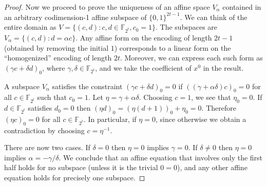 \documentclass[11pt]{article}
\numberwithin{equation}{section}
\begin{document}
\begin{proof}
Now we proceed to prove the uniqueness of an affine space $V_{\alpha}$ contained in an arbitrary codimension-1 affine subspace of $\{0,1\}^{2t-1}$.
We can think of the entire domain as $V = \{(c,d) : c,d \in \mathbb{F}_{2^t}, c_0 = 1\}$. The subspaces are $V_\alpha = \{(c,d) : d = \alpha c\}$. Any affine form on the encoding of length $2t-1$ (obtained by removing the initial $1$) corresponds to a linear form on the ``homogenized'' encoding of length $2t$. Moreover, we can express each such form as $(\gamma c + \delta d)_0$, where $\gamma,\delta \in \mathbb{F}_{2^t}$, and we take the coefficient of $x^0$ in the result.

A subspace $V_\alpha$ satisfies the constraint $(\gamma c + \delta d)_0 = 0$ if $((\gamma + \alpha \delta) c)_0 = 0$ for all $c \in \mathbb{F}_{2^t}$ such that $c_0 = 1$. Let $\eta = \gamma + \alpha \delta$. Choosing $c = 1$, we see that $\eta_0 = 0$. If $d \in \mathbb{F}_{2^t}$ satisfies $d_0 = 0$ then $(\eta d)_0 = (\eta (d + 1))_0 + \eta_0 = 0$. Therefore $(\eta c)_0 = 0$ for all $c \in \mathbb{F}_{2^t}$. In particular, if $\eta = 0$, since otherwise we obtain a contradiction by choosing $c = \eta^{-1}$.

There are now two cases. If $\delta = 0$ then $\eta = 0$ implies $\gamma = 0$. If $\delta \neq 0$ then $\eta = 0$ implies $\alpha = -\gamma/\delta$. We conclude that an affine equation that involves only the first half holds for no subspace (unless it is the trivial $0 = 0$), and any other affine equation holds for precisely one subspace.
\end{proof}
\end{document}
